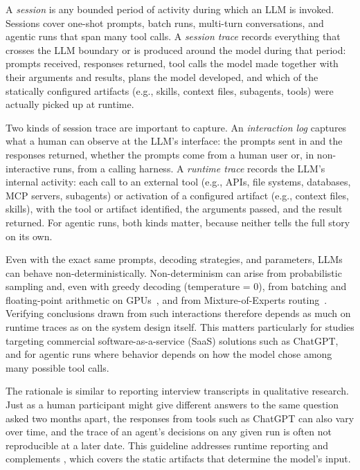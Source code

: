 
A \emph{session} is any bounded period of activity during which an LLM is invoked. Sessions cover one-shot prompts, batch runs, multi-turn conversations, and agentic runs that span many tool calls.
A \emph{session trace} records everything that crosses the LLM boundary or is produced around the model during that period: prompts received, responses returned, tool calls the model made together with their arguments and results, plans the model developed, and which of the statically configured artifacts (e.g., skills, context files, subagents, tools) were actually picked up at runtime.

Two kinds of session trace are important to capture.
An \emph{interaction log} captures what a human can observe at the LLM's interface: the prompts sent in and the responses returned, whether the prompts come from a human user or, in non-interactive runs, from a calling harness.
A \emph{runtime trace} records the LLM's internal activity: each call to an external tool (e.g., APIs, file systems, databases, MCP servers, subagents) or activation of a configured artifact (e.g., context files, skills), with the tool or artifact identified, the arguments passed, and the result returned. For agentic runs, both kinds matter, because neither tells the full story on its own.

Even with the exact same prompts, decoding strategies, and parameters, LLMs can behave non-deterministically.
Non-determinism can arise from probabilistic sampling and, even with greedy decoding (temperature = 0), from batching and floating-point arithmetic on GPUs~\cite{YuanNondeterminismLLMInference}, and from Mixture-of-Experts routing~\cite{Chann2023}.
Verifying conclusions drawn from such interactions therefore depends as much on runtime traces as on the system design itself.
This matters particularly for studies targeting commercial software-as-a-service (SaaS) solutions such as ChatGPT, and for agentic runs where behavior depends on how the model chose among many possible tool calls.

The rationale is similar to reporting interview transcripts in qualitative research.
Just as a human participant might give different answers to the same question asked two months apart, the responses from tools such as ChatGPT can also vary over time, and the trace of an agent's decisions on any given run is often not reproducible at a later date.
This guideline addresses runtime reporting and complements \design, which covers the static artifacts that determine the model's input.

